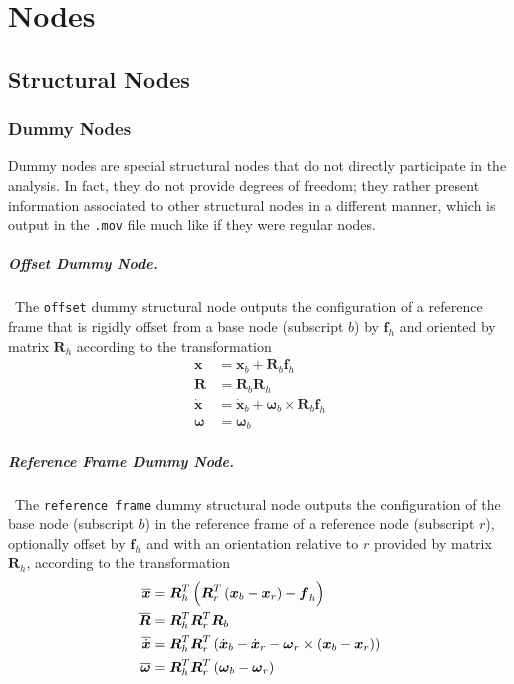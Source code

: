 \documentclass[10pt,dvips,fleqn]{report}
\newcommand{\T}[1]{\boldsymbol{#1}}
\begin{document}
\chapter{Nodes}

\section{Structural Nodes}

\subsection{Dummy Nodes}
Dummy nodes are special structural nodes that do not directly 
participate in the analysis.
In fact, they do not provide degrees of freedom; they rather
present information associated to other structural nodes 
in a different manner, which is output in the \texttt{.mov}
file much like if they were regular nodes.



\paragraph{Offset Dummy Node.} \
The \texttt{offset} dummy structural node outputs the configuration
of a reference frame that is rigidly offset from a base node
(subscript $b$) by $\T{f}_h$ and oriented by matrix $\T{R}_h$ according 
to the transformation
\begin{align}
	\T{x} &= \T{x}_b + \T{R}_b \T{f}_h \\
	\T{R} &= \T{R}_b \T{R}_h \\
	\dot{\T{x}} &= \dot{\T{x}}_b + \T{\omega}_b \times \T{R}_b \T{f}_h \\
	\T{\omega} &= \T{\omega}_b
\end{align}


\paragraph{Reference Frame Dummy Node.} \
The \texttt{reference frame} dummy structural node
outputs the configuration of the base node (subscript $b$)
in the reference frame of a reference node (subscript $r$),
optionally offset by $\T{f}_h$ and with an orientation relative 
to $r$ provided by matrix $\T{R}_h$,
according to the transformation
\begin{align}
	\overline{\T{x}} &= \T{R}_h^T \plbr{\T{R}_r^T \plbr{\T{x}_b - \T{x}_r} - \T{f}_h}\\
	\overline{\T{R}} &= \T{R}_h^T \T{R}_r^T \T{R}_b \\
	\overline{\dot{\T{x}}} &= \T{R}_h^T \T{R}_r^T \plbr{
		\dot{\T{x}}_b
		- \dot{\T{x}}_r
		- \T{\omega}_r\times\plbr{\T{x}_b - \T{x}_r}
	} \\
	\overline{\T{\omega}} &= \T{R}_h^T \T{R}_r^T \plbr{\T{\omega}_b - \T{\omega}_r}
\end{align}
\end{document}
